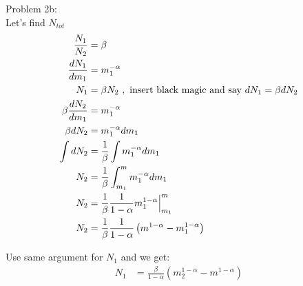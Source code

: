 \documentclass[10pt,letter,preprint]{aastex}
\newcommand{\rp}{\right)}
\newcommand{\lp}{\left(}
\newcommand{\ms}{M_\odot}
\begin{document}
Problem 2b:\\
Let's find $N_{tot}$
%
%
%
\begin{align}
\frac{N_{1}}{N_{2}}&=\beta\\
\frac{dN_{1}}{dm_{1}} &= m_1^{-\alpha}\\
N_{1}&=\beta N_{2}~, \textrm{ insert black magic and say }dN_{1}= \beta dN_{2}\\
\beta \frac{dN_{2}}{dm_{1}} &= m_{1}^{-\alpha}\\
\beta dN_{2} &= m_{1}^{-\alpha}dm_{1}\\
\int dN_{2}&=\frac{1}{\beta} \int m_{1}^{-\alpha}dm_{1}\\
N_{2}&= \frac{1}{\beta} \int_{m_{1}}^{m}m_{1}^{-\alpha}dm_{1}\\
N_{2}&= \frac{1}{\beta} \frac{1}{1-\alpha }m_{1}^{1-\alpha} \Bigl\lvert_{m_{1}}^{m}\\
N_{2}&= \frac{1}{\beta} \frac{1}{1-\alpha } \lp m^{1-\alpha} -m_{1}^{1-\alpha} \rp
\end{align}

Use same argument for $N_{1}$ and we get:
\begin{align}
N_{1} &= \frac{\beta}{1-\alpha} \lp m_{2}^{1-\alpha} - m^{1-\alpha} \rp
\end{align}
\end{document}
